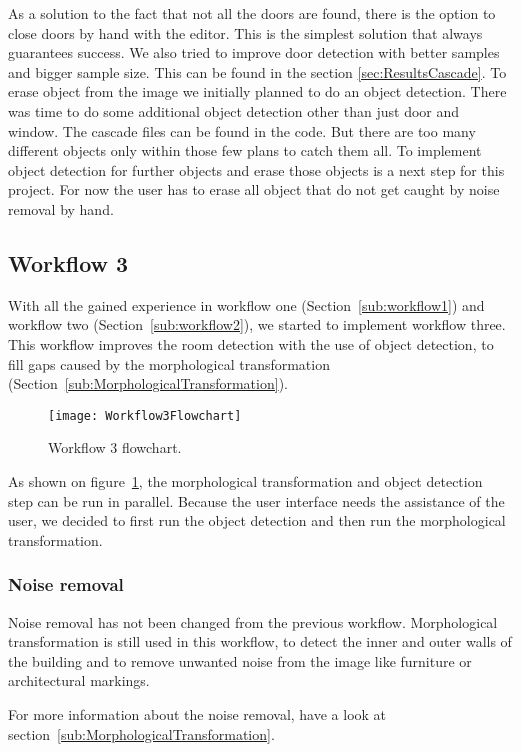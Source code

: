 As a solution to the fact that not all the doors are found, there is the option to close doors by hand with the editor. This is the simplest solution that always guarantees success. We also tried to improve door detection with better samples and bigger sample size. This can be found in the section \ref{sec:ResultsCascade}.
To erase object from the image we initially planned to do an object detection. There was time to do some additional object detection other than just door and window. The cascade files can be found in the code. But there are too many different objects only within those few plans to catch them all. To implement object detection for further objects and erase those objects is a next step for this project. For now the user has to erase all object that do not get caught by noise removal by hand.


\subsection{Workflow 3}
\label{sub:workflow3}
With all the gained experience in workflow one (Section~\ref{sub:workflow1}) and workflow two (Section~\ref{sub:workflow2}), we started to implement workflow three. This workflow improves the room detection with the use of object detection, to fill gaps caused by the morphological transformation (Section~\ref{sub:MorphologicalTransformation}).

\begin{figure}[H]
	\centering
	\texttt{[image: Workflow3Flowchart]}
	\caption{Workflow 3 flowchart.}
	\label{fig:Workflow3Flowchart}
\end{figure}

As shown on figure~\ref{fig:Workflow3Flowchart}, the morphological transformation and object detection step can be run in parallel. Because the user interface needs the assistance of the user, we decided to first run the object detection and then run the morphological transformation.

\subsubsection{Noise removal}
\label{sub:NoiseRemoval}
Noise removal has not been changed from the previous workflow. Morphological transformation is still used in this workflow, to detect the inner and outer walls of the building and to remove unwanted noise from the image like furniture or architectural markings.

For more information about the noise removal, have a look at section~\ref{sub:MorphologicalTransformation}.

